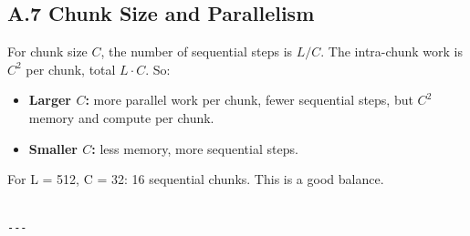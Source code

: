 \subsection{A.7 Chunk Size and Parallelism}

For chunk size $C$, the number of sequential steps is $L / C$. The 
intra-chunk work is $C^2$ per chunk, total $L \cdot C$. So:

\begin{itemize}
\item \textbf{Larger $C$:} more parallel work per chunk, fewer sequential steps, but
  $C^2$ memory and compute per chunk.
\item \textbf{Smaller $C$:} less memory, more sequential steps.

\end{itemize}
For L = 512, C = 32: 16 sequential chunks. This is a good balance.
\begin{lstlisting}

---
\end{lstlisting}
